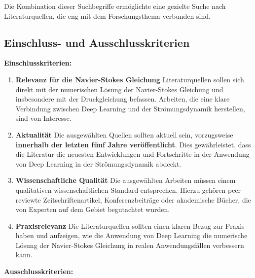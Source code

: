 Die Kombination dieser Suchbegriffe ermöglichte eine gezielte Suche nach Literaturquellen, die eng mit dem Forschungsthema verbunden sind.

\subsection{Einschluss- und Ausschlusskriterien}
\textbf{Einschlusskriterien:}

\begin{enumerate}
  \item \textbf{Relevanz für die Navier-Stokes Gleichung} Literaturquellen sollen sich direkt mit der numerischen Lösung der Navier-Stokes Gleichung und insbesondere mit der Druckgleichung befassen. Arbeiten, die eine klare Verbindung zwischen Deep Learning und der Strömungsdynamik herstellen, sind von Interesse.
  
  \item \textbf{Aktualität} Die ausgewählten Quellen sollten aktuell sein, vorzugsweise \textbf{innerhalb der letzten fünf Jahre veröffentlicht}. Dies gewährleistet, dass die Literatur die neuesten Entwicklungen und Fortschritte in der Anwendung von Deep Learning in der Strömungsdynamik abdeckt.
  
  \item \textbf{Wissenschaftliche Qualität} Die ausgewählten Arbeiten müssen einem qualitativen wissenschaftlichen Standard entsprechen. Hierzu gehören peer-reviewte Zeitschriftenartikel, Konferenzbeiträge oder akademische Bücher, die von Experten auf dem Gebiet begutachtet wurden.
  
  \item \textbf{Praxisrelevanz} Die Literaturquellen sollten einen klaren Bezug zur Praxis haben und aufzeigen, wie die Anwendung von Deep Learning die numerische Lösung der Navier-Stokes Gleichung in realen Anwendungsfällen verbessern kann.
\end{enumerate}

\textbf{Ausschlusskriterien:}

